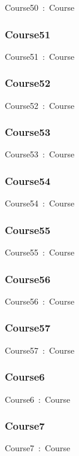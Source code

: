 \documentclass{article}
\begin{document}
Course50~:~Course

\subsubsection*{Course51}

Course51~:~Course

\subsubsection*{Course52}

Course52~:~Course

\subsubsection*{Course53}

Course53~:~Course

\subsubsection*{Course54}

Course54~:~Course

\subsubsection*{Course55}

Course55~:~Course

\subsubsection*{Course56}

Course56~:~Course

\subsubsection*{Course57}

Course57~:~Course

\subsubsection*{Course6}

Course6~:~Course

\subsubsection*{Course7}

Course7~:~Course
\end{document}
